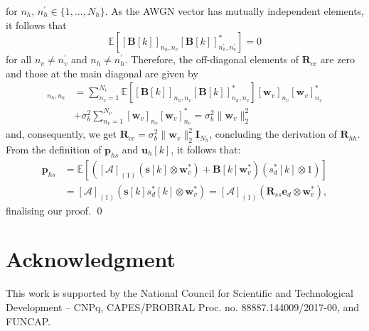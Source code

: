 \documentclass{cta-author}
\newcommand{\mc}[1]{\ensuremath{\mathcal{#1}}}				%
\newcommand{\esp}[1]{\ensuremath{\mathbb{E}\left[#1\right]}}		%
\newcommand{\Rss}{\bm{R}_{ss}}
\newcommand{\edes}{\bm{e}_{d}}
\begin{document}
for $n_h,\,n_h^\prime \in \{1,\ldots, N_h \}$. As the AWGN vector has mutually independent elements, it follows that
\begin{equation}
\esp{\left[\bm{B}[k] \right]_{n_h, n_v} \left[ \bm{B}[k] \right]_{n_h^\prime, n_v^\prime}^*} = 0
\end{equation} 
for all $n_v \neq n_v^\prime$ and $n_h \neq n_h^\prime$. Therefore, the off-diagonal elements of $\bm{R}_{cc}$ are zero and those at the main diagonal are given by
	\begin{align}
[\bm{R}_{cc}]_{n_h, n_h} &= \sum_{n_v=1}^{N_v} \esp{\left[ \bm{B}[k] \right]_{n_h, n_v} \left[ \bm{B}[k] \right]_{n_h, n_v}^*} \left[\bm{w}_v\right]_{n_v} \left[\bm{w}_v\right]_{n_v}^* \\
&+\sigma_b^2 \sum_{n_v=1}^{N_v} \left[\bm{w}_v\right]_{n_v} \left[\bm{w}_v\right]_{n_v}^* = \sigma_b^2  \|\bm{w}_v\|^2_2 \label{eq:noise_devel_final}
\end{align}
and, consequently, we get $\bm{R}_{cc} = \sigma_b^2  \|\bm{w}_v\|^2_2 \bm{I}_{N_h}$, concluding the derivation of $\bm{R}_{hh}$. From the definition of $\bm{p}_{hs}$ and $\bm{u}_h[k]$, it follows that:
\begin{align}
\bm{p}_{hs} &= \esp{ \left( [\mc{A}]_{(1)} (\bm{s}[k] \otimes \bm{w}_v^*) + \bm{B}[k]\bm{w}_v^* \right) (s_d^*[k] \otimes 1)}\\
			   &= [\mc{A}]_{(1)} (\bm{s}[k] s_d^*[k] \otimes \bm{w}_v^*) = [\mc{A}]_{(1)} ( \Rss\edes \otimes \bm{w}_v^*),
\end{align}
finalising our proof. \qed

\section*{Acknowledgment}
This work is supported by the National Council for Scientific and Technological Development -- CNPq, CAPES/PROBRAL Proc. no. 88887.144009/2017-00, and FUNCAP.



\end{document}
